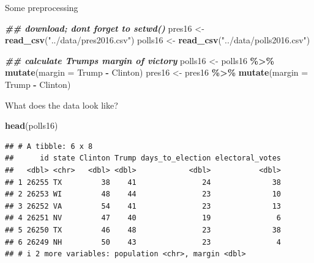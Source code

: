\documentclass[
  ignorenonframetext,
]{beamer}
\newenvironment{Shaded}{\begin{snugshade}}{\end{snugshade}}
\newcommand{\AttributeTok}[1]{\textcolor[rgb]{0.13,0.29,0.53}{#1}}
\newcommand{\DocumentationTok}[1]{\textcolor[rgb]{0.56,0.35,0.01}{\textbf{\textit{#1}}}}
\newcommand{\FunctionTok}[1]{\textcolor[rgb]{0.13,0.29,0.53}{\textbf{#1}}}
\newcommand{\NormalTok}[1]{#1}
\newcommand{\OtherTok}[1]{\textcolor[rgb]{0.56,0.35,0.01}{#1}}
\newcommand{\SpecialCharTok}[1]{\textcolor[rgb]{0.81,0.36,0.00}{\textbf{#1}}}
\newcommand{\StringTok}[1]{\textcolor[rgb]{0.31,0.60,0.02}{#1}}
\begin{document}
\begin{frame}[fragile]{Some preprocessing}
\label{some-preprocessing}
\begin{Shaded}
\begin{Highlighting}[]
\DocumentationTok{\#\# download; don\textquotesingle{}t forget to setwd()}
\NormalTok{pres16 }\OtherTok{\textless{}{-}} \FunctionTok{read\_csv}\NormalTok{(}\StringTok{"../data/pres2016.csv"}\NormalTok{)}
\NormalTok{polls16 }\OtherTok{\textless{}{-}} \FunctionTok{read\_csv}\NormalTok{(}\StringTok{"../data/polls2016.csv"}\NormalTok{)}

\DocumentationTok{\#\# calculate Trump\textquotesingle{}s margin of victory}
\NormalTok{polls16 }\OtherTok{\textless{}{-}}\NormalTok{ polls16 }\SpecialCharTok{\%\textgreater{}\%}
  \FunctionTok{mutate}\NormalTok{(}\AttributeTok{margin =}\NormalTok{ Trump }\SpecialCharTok{{-}}\NormalTok{ Clinton)}
\NormalTok{pres16 }\OtherTok{\textless{}{-}}\NormalTok{ pres16 }\SpecialCharTok{\%\textgreater{}\%}
  \FunctionTok{mutate}\NormalTok{(}\AttributeTok{margin =}\NormalTok{ Trump }\SpecialCharTok{{-}}\NormalTok{ Clinton)}
\end{Highlighting}
\end{Shaded}
\end{frame}

\begin{frame}[fragile]{What does the data look like?}
\label{what-does-the-data-look-like}
\footnotesize

\begin{Shaded}
\begin{Highlighting}[]
\FunctionTok{head}\NormalTok{(polls16)}
\end{Highlighting}
\end{Shaded}

\begin{verbatim}
## # A tibble: 6 x 8
##      id state Clinton Trump days_to_election electoral_votes
##   <dbl> <chr>   <dbl> <dbl>            <dbl>           <dbl>
## 1 26255 TX         38    41               24              38
## 2 26253 WI         48    44               23              10
## 3 26252 VA         54    41               23              13
## 4 26251 NV         47    40               19               6
## 5 26250 TX         46    48               23              38
## 6 26249 NH         50    43               23               4
## # i 2 more variables: population <chr>, margin <dbl>
\end{verbatim}
\end{frame}
\end{document}
